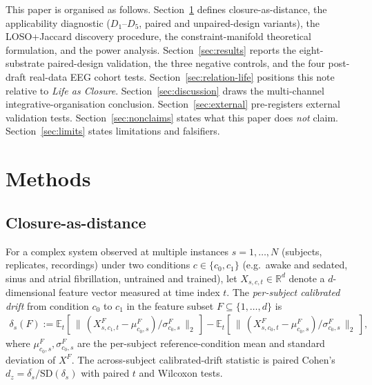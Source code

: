 \documentclass[11pt,a4paper]{article}
\begin{document}
\bigskip
\noindent{}
\bigskip

This paper is organised as follows. Section~\ref{sec:method} defines closure-as-distance, the applicability diagnostic ($D_1$--$D_5$, paired and unpaired-design variants), the LOSO+Jaccard discovery procedure, the constraint-manifold theoretical formulation, and the power analysis. Section~\ref{sec:results} reports the eight-substrate paired-design validation, the three negative controls, and the four post-draft real-data EEG cohort tests. Section~\ref{sec:relation-life} positions this note relative to \emph{Life as Closure}. Section~\ref{sec:discussion} draws the multi-channel integrative-organisation conclusion. Section~\ref{sec:external} pre-registers external validation tests. Section~\ref{sec:nonclaims} states what this paper does \emph{not} claim. Section~\ref{sec:limits} states limitations and falsifiers.

\section{Methods}\label{sec:method}

\subsection{Closure-as-distance}\label{sec:method-closure}

For a complex system observed at multiple instances $s = 1, \ldots, N$ (subjects, replicates, recordings) under two conditions $c \in \{c_0, c_1\}$ (e.g.\ awake and sedated, sinus and atrial fibrillation, untrained and trained), let $X_{s,c,t} \in \mathbb{R}^d$ denote a $d$-dimensional feature vector measured at time index $t$. The \emph{per-subject calibrated drift} from condition $c_0$ to $c_1$ in the feature subset $F \subseteq \{1, \ldots, d\}$ is
\begin{align*}
\delta_s(F) := \mathbb{E}_t\!\left[\,\big\|\,(X_{s,c_1,t}^F - \mu^F_{c_0,s})/\sigma^F_{c_0,s}\,\big\|_2\,\right] - \mathbb{E}_t\!\left[\,\big\|\,(X_{s,c_0,t}^F - \mu^F_{c_0,s})/\sigma^F_{c_0,s}\,\big\|_2\,\right],
\end{align*}
where $\mu^F_{c_0,s}, \sigma^F_{c_0,s}$ are the per-subject reference-condition mean and standard deviation of $X^F$. The across-subject calibrated-drift statistic is paired Cohen's $d_z = \overline{\delta_s}/\mathrm{SD}(\delta_s)$ with paired $t$ and Wilcoxon tests.
\end{document}
